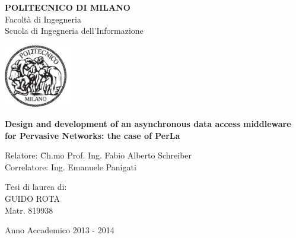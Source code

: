 \begin{titlepage}
\begin{center}

\begin{large}
	\textbf{POLITECNICO DI MILANO}\\
	Facoltà di Ingegneria\\
	Scuola di Ingegneria dell'Informazione
\end{large}

\vspace{2cm}
\includegraphics[width=3cm]{imgs/poli.pdf}

\vspace{2cm}
\begin{Large}
\textbf{
Design and development of an asynchronous data access middleware for Pervasive Networks: the case of PerLa
}
\end{Large}

\vfill

\begin{normalsize}
\begin{onehalfspace}

	\begin{flushleft}
	\begin{tabbing}
	Relatore: \hspace{8pt} \= Ch.mo Prof. Ing. Fabio Alberto Schreiber\\
	Correlatore: \> Ing. Emanuele Panigati
	\end{tabbing}
	\end{flushleft}

	\vspace{1cm}
	\begin{flushright}
	\begin{tabbing}
	\hspace{330pt}
	\= Tesi di laurea di:\\
	\> GUIDO ROTA \\
	\> Matr. 819938\\
	\end{tabbing}
	\end{flushright}
	
\end{onehalfspace}
\end{normalsize}

\vspace{2cm}
\begin{small}
Anno Accademico 2013 - 2014
\end{small}

\end{center}
\end{titlepage}
\restoregeometry
